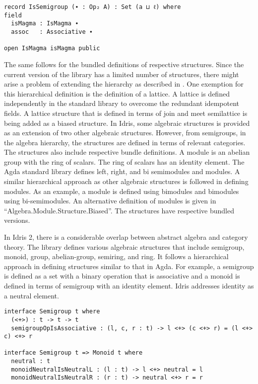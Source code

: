 \begin{verbatim}
record IsSemigroup (∙ : Op₂ A) : Set (a ⊔ ℓ) where
field
  isMagma : IsMagma ∙
  assoc   : Associative ∙

open IsMagma isMagma public
\end{verbatim}
The same follows for the bundled definitions of respective structures. Since the
current version of the library has a limited number of structures, there might
arise a problem of extending the hierarchy as described in
\cite{CaretteBigMath}. One exemption for this hierarchical definition is the
definition of a lattice. A lattice is defined independently in the standard
library to overcome the redundant idempotent fields. A lattice structure that is
defined in terms of join and meet semilattice is being added as a biased
structure. In Idris, some algebraic structures is provided as an extension of
two other algebraic structures. However, from semigroups, in the algebra
hierarchy, the structures are defined in terms of relevant categories. The
structures also include respective bundle definitions. A module is an abelian
group with the ring of scalars. The ring of scalars has an identity element. The
Agda standard library defines left, right, and bi semimodules and modules. A
similar hierarchical approach as other algebraic structures is followed in
defining modules. As an example, a module is defined using bimodules and
bimodules using bi-semimodules. An alternative definition of modules is given in
“Algebra.Module.Structure.Biased”. The structures have respective bundled
versions. 

In Idris 2, there is a considerable overlap between abstract algebra and category
theory. The library defines various algebraic structures that include semigroup,
monoid, group, abelian-group, semiring, and ring. It follows a hierarchical
approach in defining structures similar to that in Agda. For example, a
semigroup is defined as a set with a binary operation that is associative and a
monoid is defined in terms of semigroup with an identity element. Idris
addresses identity as a neutral element.

\begin{verbatim}
interface Semigroup t where
  (<+>) : t -> t -> t
  semigroupOpIsAssociative : (l, c, r : t) -> l <+> (c <+> r) = (l <+> c) <+> r

interface Semigroup t => Monoid t where
  neutral : t
  monoidNeutralIsNeutralL : (l : t) -> l <+> neutral = l
  monoidNeutralIsNeutralR : (r : t) -> neutral <+> r = r
\end{verbatim}

